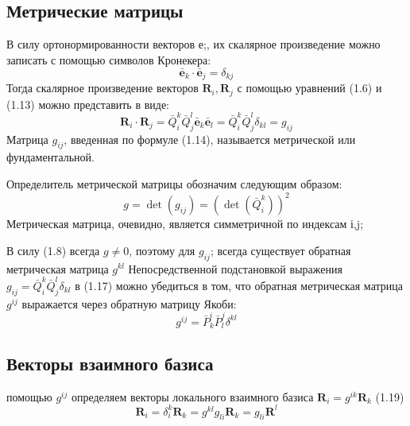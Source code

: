 \subsection{Метрические матрицы}
В силу ортонормированности векторов е;, их скалярное произведение можно записать с помощью символов Кронекера:
\begin{equation}
    \bar{\textbf{e}}_k \cdot \bar{\textbf{e}}_j = \delta_{kj}
\end{equation}
Тогда скалярное произведение векторов $\textbf{R}_i, \textbf{R}_j$ с помощью уравнений (1.6) и (1.13) можно представить в виде:
\begin{equation}
    \textbf{R}_i\cdot \textbf{R}_j = 
    \bar{Q}^k_i \bar{Q}^l_j \bar{\textbf{e}}_k \bar{\textbf{e}}_l =
    \bar{Q}^k_i \bar{Q}^l_j \delta_{kl} =
    g_{ij}
\end{equation}
 Матрица $g_{ij}$, введенная по формуле (1.14), называется
метрической или фундаментальной.

Определитель метрической матрицы обозначим следующим образом:
\begin{equation}
    g = \det(g_{ij}) = (\det(\bar{Q}^k_i))^2
\end{equation}
Метрическая матрица, очевидно, является симметричной по индексам і,j;

В силу (1.8) всегда $g \ne 0$, поэтому для $g_{ij}$; всегда существует обратная метрическая матрица $g^{kl}$
Непосредственной подстановкой выражения $g_{ij} = \bar{Q}^k_i \bar{Q}^l_j \delta_{kl}$ в (1.17) можно убедиться в том, что обратная метрическая матрица $g^{ij}$ выражается через обратную матрицу Якоби:
\begin{equation}
    g^{ij} = \bar{P}^i_k \bar{P}^j_l \delta^{kl}
\end{equation}
\subsection{Векторы взаимного базиса}
 помощью $g^{ij}$ определяем векторы локального взаимного базиса $\textbf{R}_i =g^{ik}\textbf{R}_k$
(1.19)
\begin{equation}
    \textbf{R}_i = \delta^k_i\textbf{R}_k =
    g^{kl}g_{li}\textbf{R}_k = g_{li}\textbf{R}^l
\end{equation}